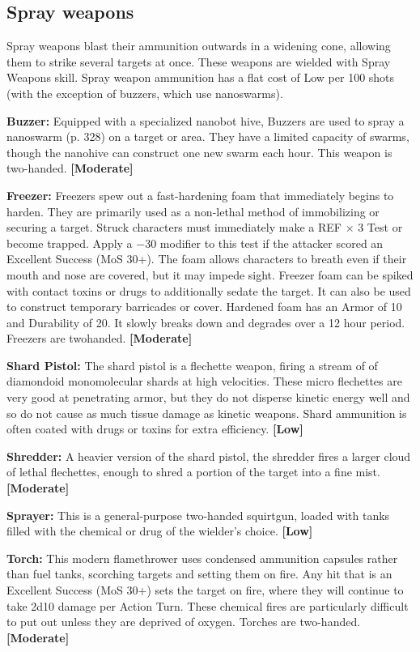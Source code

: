 \subsection{Spray weapons} \label{sec:spray-weapons} 

Spray weapons blast their ammunition outwards in a widening cone, allowing them to strike several targets at once. These weapons are wielded with Spray Weapons skill. Spray weapon ammunition has a flat cost of Low per 100 shots (with the exception of buzzers, which use nanoswarms). 

\textbf{Buzzer:} Equipped with a specialized nanobot hive, Buzzers are used to spray a nanoswarm (p. 328) on a target or area. They have a limited capacity of swarms, though the nanohive can construct one new swarm each hour. This weapon is two-handed. \textbf{[Moderate]} 

\textbf{Freezer:} Freezers spew out a fast-hardening foam that immediately begins to harden. They are primarily used as a non-lethal method of immobilizing or securing a target. Struck characters must immediately make a REF $\times$ 3 Test or become trapped. Apply a $-$30 modifier to this test if the attacker scored an Excellent Success (MoS 30+). The foam allows characters to breath even if their mouth and nose are covered, but it may impede sight. Freezer foam can be spiked with contact toxins or drugs to additionally sedate the target. It can also be used to construct temporary barricades or cover. Hardened foam has an Armor of 10 and Durability of 20. It slowly breaks down and degrades over a 12 hour period. Freezers are twohanded. \textbf{[Moderate]} 

\textbf{Shard Pistol:} The shard pistol is a flechette weapon, firing a stream of of diamondoid monomolecular shards at high velocities. These micro flechettes are very good at penetrating armor, but they do not disperse kinetic energy well and so do not cause as much tissue damage as kinetic weapons. Shard ammunition is often coated with drugs or toxins for extra efficiency. \textbf{[Low]} 

\textbf{Shredder:} A heavier version of the shard pistol, the shredder fires a larger cloud of lethal flechettes, enough to shred a portion of the target into a fine mist. \textbf{[Moderate]} 

\textbf{Sprayer:} This is a general-purpose two-handed squirtgun, loaded with tanks filled with the chemical or drug of the wielder’s choice. \textbf{[Low]} 

\textbf{Torch:} This modern flamethrower uses condensed ammunition capsules rather than fuel tanks, scorching targets and setting them on fire. Any hit that is an Excellent Success (MoS 30+) sets the target on fire, where they will continue to take 2d10 damage per Action Turn. These chemical fires are particularly difficult to put out unless they are deprived of oxygen. Torches are two-handed. \textbf{[Moderate]} 

